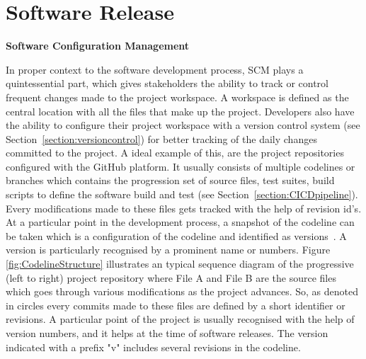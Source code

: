 \section{Software Release} \label{section:Softwareconfigurationmanagement}

\vspace{0.2cm}
\noindent \textbf{Software Configuration Management}
\vspace{0.2cm}

\noindent In proper context to the software development process, \ac{SCM} plays a quintessential part, which gives stakeholders the ability to track or control frequent changes made to the project workspace. A workspace is defined as the central location with all the files that make up the project. Developers also have the ability to configure their project workspace with a version control system (see Section~\ref{section:versioncontrol}) for better tracking of the daily changes committed to the project. A ideal example of this, are the project repositories configured with the GitHub platform. It usually consists of multiple codelines or branches which contains the progression set of source files, test suites, build scripts to define the software build and test (see Section~\ref{section:CICDpipeline}). Every modifications made to these files gets tracked with the help of revision id's. At a particular point in the development process, a snapshot of the codeline can be taken which is a configuration of the codeline and identified as versions~\parencite{berczuk2003software}. A version is particularly recognised by a prominent name or numbers. Figure \ref{fig:CodelineStructure} illustrates an typical sequence diagram of the progressive (left to right) project repository where File A and File B are the source files which goes through various modifications as the project advances. So, as denoted in circles every commits made to these files are defined by a short identifier or revisions. A particular point of the project is usually recognised with the help of version numbers, and it helps at the time of software releases. The version indicated with a prefix "v" includes several revisions in the codeline.


